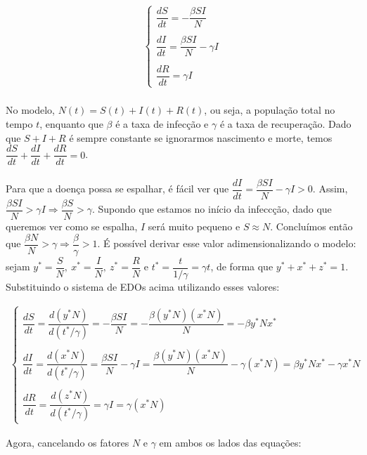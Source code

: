 \documentclass[12pt]{article}
\begin{document}
\begin{gather*}
\begin{cases}
\dfrac{dS}{dt} = -\dfrac{\beta SI}{N} \\
\\
\dfrac{dI}{dt} = \dfrac{\beta SI}{N} - \gamma I \\
\\
\dfrac{dR}{dt} = \gamma I
\end{cases}
\end{gather*}
\\
No modelo, $N(t) = S(t)+I(t)+R(t)$, ou seja, a população total no tempo $t$, enquanto que $\beta$ é a taxa de infecção e $\gamma$ é a taxa de recuperação. Dado que $S+I+R$ é sempre constante se ignorarmos nascimento e morte, temos $\dfrac{dS}{dt}+\dfrac{dI}{dt}+\dfrac{dR}{dt} = 0$. 
\\\\
Para que a doença possa se espalhar, é fácil ver que $\dfrac{dI}{dt} = \dfrac{\beta SI}{N} - \gamma I > 0$. Assim, $\dfrac{\beta SI}{N} > \gamma I \Rightarrow \dfrac{\beta S}{N} > \gamma$. Supondo que estamos no início da infeccção, dado que queremos ver como se espalha, $I$ será muito pequeno e $S \approx N$. Concluímos então que $\dfrac{\beta N}{N} > \gamma \Rightarrow \dfrac{\beta}{\gamma} > 1$. É possível derivar esse valor adimensionalizando o modelo: sejam $y^* = \dfrac{S}{N}, \ x^* = \dfrac{I}{N}, \ z^* = \dfrac{R}{N}$ e $t^*=\dfrac{t}{1/\gamma} = \gamma t$, de forma que $y^*+x^*+z^*=1$. Substituindo o sistema de EDOs acima utilizando esses valores:

\begin{gather*}
\begin{cases}
\dfrac{dS}{dt} = \dfrac{d(y^*N)}{d(t^*/\gamma)} = -\dfrac{\beta SI}{N} = -\dfrac{\beta(y^*N)(x^*N)}{N} = -\beta y^*Nx^* \\
\\
\dfrac{dI}{dt} = \dfrac{d(x^*N)}{d(t^*/\gamma)} = \dfrac{\beta SI}{N} - \gamma I = \dfrac{\beta(y^*N)(x^*N)}{N} -\gamma(x^*N) = \beta y^*Nx^* - \gamma x^*N \\
\\
\dfrac{dR}{dt} = \dfrac{d(z^*N)}{d(t^*/\gamma)} = \gamma I = \gamma(x^*N)
\end{cases}
\end{gather*}

Agora, cancelando os fatores $N$ e $\gamma$ em ambos os lados das equações:
\end{document}
